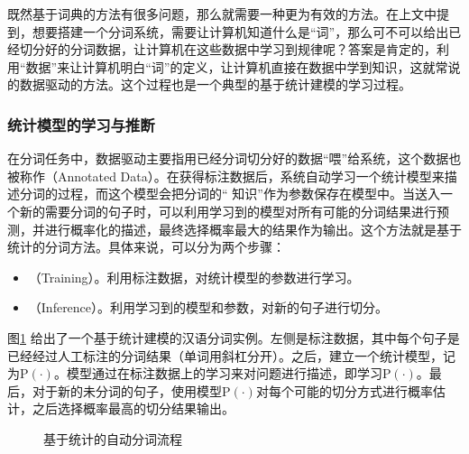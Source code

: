 \parinterval 既然基于词典的方法有很多问题，那么就需要一种更为有效的方法。在上文中提到，想要搭建一个分词系统，需要让计算机知道什么是``词''，那么可不可以给出已经切分好的分词数据，让计算机在这些数据中学习到规律呢？答案是肯定的，利用``数据''来让计算机明白``词''的定义，让计算机直接在数据中学到知识，这就常说的数据驱动的方法。这个过程也是一个典型的基于统计建模的学习过程。


\subsubsection{统计模型的学习与推断}

\parinterval 在分词任务中，数据驱动主要指用已经分词切分好的数据``喂''给系统，这个数据也被称作{\small{}}（Annotated Data）。在获得标注数据后，系统自动学习一个统计模型来描述分词的过程，而这个模型会把分词的`` 知识''作为参数保存在模型中。当送入一个新的需要分词的句子时，可以利用学习到的模型对所有可能的分词结果进行预测，并进行概率化的描述，最终选择概率最大的结果作为输出。这个方法就是基于统计的分词方法。具体来说，可以分为两个步骤：

\begin{itemize}
\vspace{0.5em}
\item {\small{}}（Training）。利用标注数据，对统计模型的参数进行学习。
\vspace{0.5em}
\item {\small{}}（Inference）。利用学习到的模型和参数，对新的句子进行切分。
\vspace{0.5em}
\end{itemize}

\parinterval 图\ref{fig:2-10} 给出了一个基于统计建模的汉语分词实例。左侧是标注数据，其中每个句子是已经经过人工标注的分词结果（单词用斜杠分开）。之后，建立一个统计模型，记为$\textrm{P}(\cdot)$。模型通过在标注数据上的学习来对问题进行描述，即学习$\textrm{P}(\cdot)$。最后，对于新的未分词的句子，使用模型$\textrm{P}(\cdot)$对每个可能的切分方式进行概率估计，之后选择概率最高的切分结果输出。

\begin{figure}[htp]
\centering

\caption{基于统计的自动分词流程}
\label{fig:2-10}
\end{figure}
\vspace{-1em}

